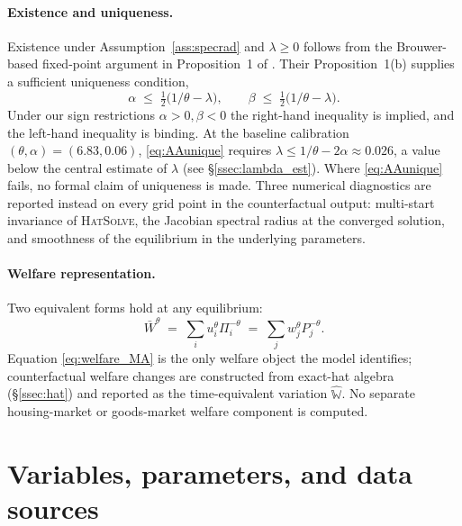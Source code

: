 \documentclass[12pt]{article}
\newcommand{\Wbar}{\bar W}
\begin{document}
\paragraph{Existence and uniqueness.}
Existence under Assumption~\ref{ass:specrad} and $\lambda\ge 0$
follows from the Brouwer-based fixed-point argument in Proposition~1
of \citet{AllenArkolakis2022}.  Their Proposition~1(b) supplies a
sufficient uniqueness condition,
\begin{equation}
  \alpha\;\le\;\tfrac{1}{2}\bigl(1/\theta-\lambda\bigr),
  \qquad
  \beta\;\le\;\tfrac{1}{2}\bigl(1/\theta-\lambda\bigr).
  \label{eq:AAunique}
\end{equation}
Under our sign restrictions $\alpha>0,\beta<0$ the right-hand
inequality is implied, and the left-hand inequality is binding.  At
the baseline calibration $(\theta,\alpha)=(6.83,0.06)$,
\eqref{eq:AAunique} requires $\lambda\le 1/\theta-2\alpha\approx
0.026$, a value below the central estimate of $\lambda$ (see
\S\ref{ssec:lambda_est}).  Where \eqref{eq:AAunique} fails, no
formal claim of uniqueness is made.  Three numerical diagnostics are
reported instead on every grid point in the counterfactual output:
multi-start invariance of \textsc{HatSolve}, the Jacobian spectral
radius at the converged solution, and smoothness of the equilibrium
in the underlying parameters.

\paragraph{Welfare representation.}
Two equivalent forms hold at any equilibrium:
\begin{equation}
  \Wbar^{\theta}
  \;=\;\sum_i u_i^{\theta}\Pi_i^{-\theta}
  \;=\;\sum_j w_j^{\theta}P_j^{-\theta}.
  \label{eq:welfare_MA}
\end{equation}
Equation \eqref{eq:welfare_MA} is the only welfare object the model
identifies; counterfactual welfare changes are constructed from
exact-hat algebra (\S\ref{ssec:hat}) and reported as the time-equivalent
variation $\hat{\mathbb W}$.  No separate housing-market or goods-market
welfare component is computed.

\section{Variables, parameters, and data sources}\label{sec:inventory}
\end{document}
